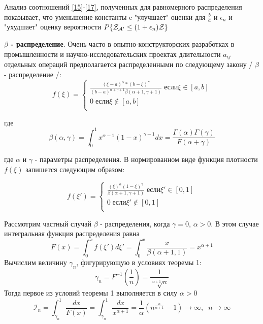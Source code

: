 \documentclass[a4paper, 14pt]{extarticle}
\begin{document}
Анализ соотношений \ref{15}-\ref{17}, полученных для равномерного распределения показывает, что уменьшение константы c "улучшает" оценки для $\frac{b}{a}$ и $\epsilon_n$ и "ухудшает" оценку вероятности $P \{ \text{$\mathcal{Z_{A'}}$} \leq (1+\epsilon_n)\mathcal{Z} \}$

\textbf{$\beta$ - распределение}. Очень часто в опытно-конструкторских разработках в промышленности и научно-исследовательских проектах длительности $a_{ij}$ отдельных операций предполагается распределенными по следующему закону / $\beta$ - распределение /:
\begin{equation}
f(\xi) = 
\begin{cases}
   \frac{(\xi-a)^\alpha*(b-\xi)^\gamma}{(b-a)^{\alpha+\gamma+1} \beta(\alpha+1, \gamma+1)} \; если \xi \in [a,b]\\
   0 \; если \xi \notin [a,b] \\
 \end{cases}
\end{equation}

где
\begin{equation}
\beta(\alpha, \gamma) = \int_0^1 x^{\alpha-1} (1-x)^{\gamma-1} dx = \frac{\Gamma(\alpha)\Gamma(\gamma)}{F(\alpha+\gamma)}
\end{equation}

где $\alpha$ и $\gamma$ - параметры распределения. В нормированном виде функция плотности $f(\xi)$ запишется следующим образом:

\begin{equation}
f(\xi') = 
\begin{cases}
   \frac{(\xi)^\alpha (1-\xi)^\gamma}{ \beta(\alpha+1, \gamma+1)} \; если \xi' \in [0,1]\\
   0 \; если \xi' \notin [0,1] \\
 \end{cases}
\end{equation}

Рассмотрим частный случай $\beta$ - распределения, когда $\gamma=0$, $\alpha>0$. В этом случае интегральная функция распределения равна
\begin{equation}
F(x) = \int_0^x f(\xi')d\xi' = \int_0^x \frac{x}{\beta(\alpha+1,1)} = x^{\alpha+1}
\end{equation} 
Вычислим величину $\gamma_n$, фигурирующую в условиях теоремы 1:
\begin{equation}
\gamma_n = F^{-1}(\frac{1}{n}) = \frac{1}{\sqrt[\alpha+1]{n}}
\end{equation}
Тогда первое из условий теоремы 1 выполняется в силу $\alpha>0$
\begin{equation}
\mathcal{I}_n = \int_{\gamma_n}^1 \frac{dx}{F(x)} = \int_{\gamma_n}^1 \frac{dx}{x^{\alpha+1}} = \frac{1}{\alpha} (n^{\frac{\alpha}{\alpha+1}}-1) \rightarrow \infty, \; \; n\rightarrow \infty
\end{equation}
\end{document}
